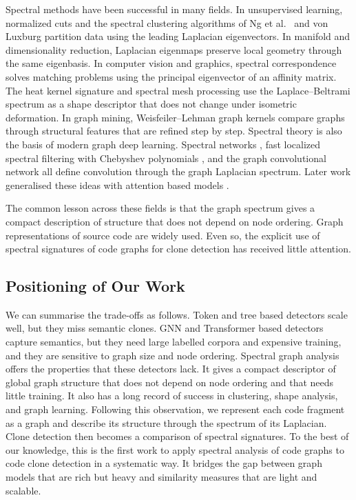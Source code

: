 \documentclass[authoryear,final,5p,times,twocolumn]{elsarticle}
\theoremstyle{plain}
\begin{document}
Spectral methods have been successful in many fields. In unsupervised
learning, normalized cuts \cite{shi2000normalized} and the spectral
clustering algorithms of Ng et al.\ \cite{ng2002spectral} and von Luxburg
\cite{vonluxburg2007tutorial} partition data using the leading Laplacian
eigenvectors. In manifold and dimensionality reduction, Laplacian
eigenmaps \cite{belkin2003laplacian} preserve local geometry through the
same eigenbasis. In computer vision and graphics, spectral correspondence
\cite{leordeanu2005spectral} solves matching problems using the principal
eigenvector of an affinity matrix. The heat kernel signature
\cite{sun2009hks} and spectral mesh processing
\cite{zhang2010spectralmesh} use the Laplace--Beltrami spectrum as a shape
descriptor that does not change under isometric deformation. In graph
mining, Weisfeiler--Lehman graph kernels \cite{shervashidze2011wl} compare
graphs through structural features that are refined step by step. Spectral
theory is also the basis of modern graph deep learning. Spectral networks
\cite{bruna2014spectral}, fast localized spectral filtering with Chebyshev
polynomials \cite{defferrard2016cnngraph}, and the graph convolutional
network \cite{kipf2017gcn} all define convolution through the graph
Laplacian spectrum. Later work generalised these ideas with attention
based models \cite{velickovic2018gat}.

The common lesson across these fields is that the graph spectrum gives a
compact description of structure that does not depend on node ordering.
Graph representations of source code are widely used. Even so, the
explicit use of spectral signatures of code graphs for clone detection
has received little attention.

\subsection{Positioning of Our Work}
\label{subsec:gap}

We can summarise the trade-offs as follows. Token and tree based detectors
scale well, but they miss semantic clones. GNN and Transformer based
detectors capture semantics, but they need large labelled corpora and
expensive training, and they are sensitive to graph size and node
ordering. Spectral graph analysis offers the properties that these
detectors lack. It gives a compact descriptor of global graph structure
that does not depend on node ordering and that needs little training. It
also has a long record of success in clustering, shape analysis, and graph
learning. Following this observation, we represent each code fragment as a
graph and describe its structure through the spectrum of its Laplacian.
Clone detection then becomes a comparison of spectral signatures. To the
best of our knowledge, this is the first work to apply spectral analysis
of code graphs to code clone detection in a systematic way. It bridges the
gap between graph models that are rich but heavy and similarity measures
that are light and scalable.
\end{document}
